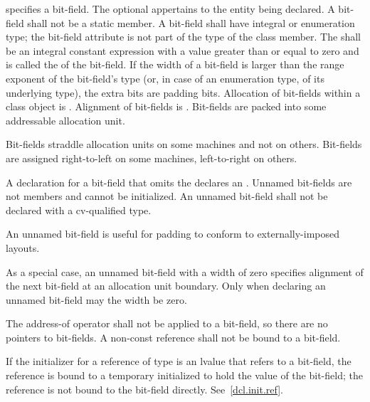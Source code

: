 %
%
specifies a bit-field.
The optional  appertains
to the entity being declared.
A bit-field shall not be a static member.
%
A bit-field shall have integral or enumeration type;
the bit-field attribute is not part of the type of the class member.
The  shall be an integral constant expression
with a value greater than or equal to zero and
is called the  of the bit-field.
If the width of a bit-field is larger than
the range exponent of the bit-field's type
(or, in case of an enumeration type, of its underlying type),
the extra bits are padding bits.
%
Allocation of bit-fields within a class object is
.
%
Alignment of bit-fields is .
%
Bit-fields are packed into some addressable allocation unit.
\begin{note}
Bit-fields straddle allocation units on some machines and not on others.
Bit-fields are assigned right-to-left on some machines, left-to-right on
others.
\end{note}

\pnum
{}%
A declaration for a bit-field that omits the 
declares an . Unnamed bit-fields are not
members and cannot be initialized.
An unnamed bit-field shall not be declared with a cv-qualified type.
\begin{note}
An unnamed bit-field is useful for padding to conform to
externally-imposed layouts.
\end{note}
%
%
As a special case, an unnamed bit-field with a width of zero specifies
alignment of the next bit-field at an allocation unit boundary. Only
when declaring an unnamed bit-field may the width be zero.

\pnum
{}%
The address-of operator \tcode{\&} shall not be applied to a bit-field,
so there are no pointers to bit-fields.
%
%
%
A non-const reference shall not be bound to a
bit-field.
\begin{note}
If the initializer for a reference of type   is
an lvalue that refers to a bit-field, the reference is bound to a
temporary initialized to hold the value of the bit-field; the reference
is not bound to the bit-field directly. See~\ref{dcl.init.ref}.
\end{note}

